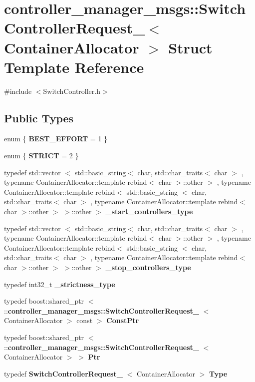 \section{controller\-\_\-manager\-\_\-msgs\-:\-:\-Switch\-Controller\-Request\-\_\-$<$ \-Container\-Allocator $>$ \-Struct \-Template \-Reference}
\label{structcontroller__manager__msgs_1_1SwitchControllerRequest__}


{\ttfamily \#include $<$\-Switch\-Controller.\-h$>$}

\subsection*{\-Public \-Types}
\begin{DoxyCompactItemize}
\item 
enum \{ {\bf \-B\-E\-S\-T\-\_\-\-E\-F\-F\-O\-R\-T} =  1
 \}
\item 
enum \{ {\bf \-S\-T\-R\-I\-C\-T} =  2
 \}
\item 
typedef std\-::vector\*
$<$ std\-::basic\-\_\-string$<$ char, \*
std\-::char\-\_\-traits$<$ char $>$\*
, typename \*
\-Container\-Allocator\-::template \*
rebind$<$ char $>$\-::other $>$\*
, typename \*
\-Container\-Allocator\-::template \*
rebind$<$ std\-::basic\-\_\-string\*
$<$ char, std\-::char\-\_\-traits$<$ char $>$\*
, typename \*
\-Container\-Allocator\-::template \*
rebind$<$ char $>$\-::other $>$\*
 $>$\-::other $>$ {\bf \-\_\-start\-\_\-controllers\-\_\-type}
\item 
typedef std\-::vector\*
$<$ std\-::basic\-\_\-string$<$ char, \*
std\-::char\-\_\-traits$<$ char $>$\*
, typename \*
\-Container\-Allocator\-::template \*
rebind$<$ char $>$\-::other $>$\*
, typename \*
\-Container\-Allocator\-::template \*
rebind$<$ std\-::basic\-\_\-string\*
$<$ char, std\-::char\-\_\-traits$<$ char $>$\*
, typename \*
\-Container\-Allocator\-::template \*
rebind$<$ char $>$\-::other $>$\*
 $>$\-::other $>$ {\bf \-\_\-stop\-\_\-controllers\-\_\-type}
\item 
typedef int32\-\_\-t {\bf \-\_\-strictness\-\_\-type}
\item 
typedef boost\-::shared\-\_\-ptr\*
$<$ \-::{\bf controller\-\_\-manager\-\_\-msgs\-::\-Switch\-Controller\-Request\-\_\-}\*
$<$ \-Container\-Allocator $>$ const  $>$ {\bf \-Const\-Ptr}
\item 
typedef boost\-::shared\-\_\-ptr\*
$<$ \-::{\bf controller\-\_\-manager\-\_\-msgs\-::\-Switch\-Controller\-Request\-\_\-}\*
$<$ \-Container\-Allocator $>$ $>$ {\bf \-Ptr}
\item 
typedef \*
{\bf \-Switch\-Controller\-Request\-\_\-}\*
$<$ \-Container\-Allocator $>$ {\bf \-Type}
\end{DoxyCompactItemize}

